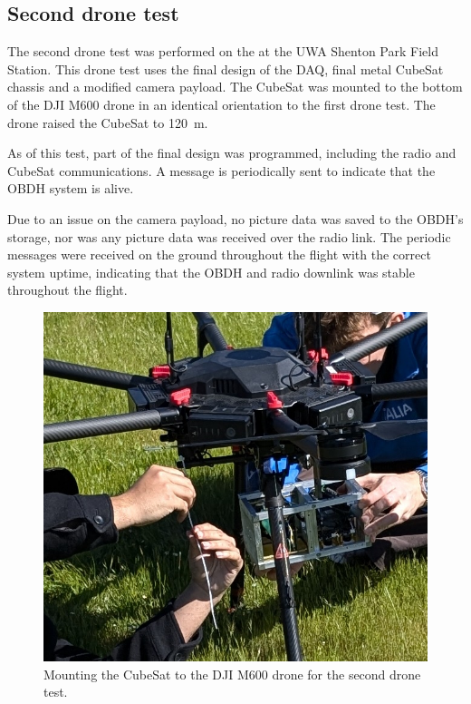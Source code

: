 \documentclass[]{report}
\begin{document}
\subsection{Second drone test}
The second drone test was performed on the  at the UWA Shenton Park Field Station. This drone test uses the final design of the DAQ, final metal CubeSat chassis and a modified camera payload. The CubeSat was mounted to the bottom of the DJI M600 drone in an identical orientation to the first drone test. The drone raised the CubeSat to \SI{120}{\metre}.

As of this test, part of the  final design was programmed, including the radio and CubeSat communications. A message is periodically sent to indicate that the OBDH system is alive.

Due to an issue on the camera payload, no picture data was saved to the OBDH's storage, nor was any picture data was received over the radio link. The periodic messages were received on the ground throughout the flight with the correct system uptime, indicating that the OBDH and radio downlink was stable throughout the flight.

\begin{figure}[H]
  \centering
  \includegraphics[width=\linewidth]{images/2nd_drone_test_setup.jpg}
  \caption{Mounting the CubeSat to the DJI M600 drone for the second drone test.}
  \label{fig:mounting-cubesat-drone-2}
\end{figure}
\end{document}
